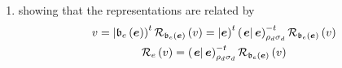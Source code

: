 \documentclass[aps,preprint]{revtex4}
\begin{document}
\begin{enumerate}
\begin{enumerate}
\item showing that the representations are related by 
\begin{gather}
v=\left\vert \mathfrak{b}_{e}\left( \boldsymbol{e}\right) \right) ^{t}%
\mathcal{R}_{\mathfrak{b}_{e}\left( \boldsymbol{e}\right) }\left( v\right)
=\left\vert \boldsymbol{e}\right) ^{t}\left( \left. \boldsymbol{e}%
\right\vert \boldsymbol{e}\right) _{\rho _{d}\sigma _{d}}^{-t}\mathcal{R}_{%
\mathfrak{b}_{e}\left( \boldsymbol{e}\right) }\left( v\right) \\
\mathcal{R}_{e}\left( v\right) =\left( \left. \boldsymbol{e}\right\vert 
\boldsymbol{e}\right) _{\rho _{d}\sigma _{d}}^{-t}\mathcal{R}_{\mathfrak{b}%
_{e}\left( \boldsymbol{e}\right) }\left( v\right)
\end{gather}
\end{enumerate}


\end{enumerate}
\end{document}
